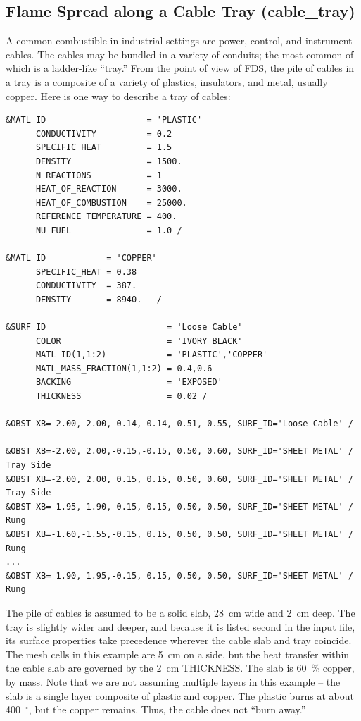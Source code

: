 \documentclass[11pt]{book}
\begin{document}
\clearpage
\subsection{Flame Spread along a Cable Tray ({\bf cable\_tray}) }

A common combustible in industrial settings are power, control, and instrument cables. The cables may be bundled in a variety of conduits; the most
common of which is a ladder-like ``tray.'' From the point of view of FDS, the pile of cables in a tray is a composite of a variety of plastics, insulators,
and metal, usually copper. Here is one way to describe a tray of cables:

\footnotesize
\begin{verbatim}
&MATL ID                    = 'PLASTIC'
      CONDUCTIVITY          = 0.2
      SPECIFIC_HEAT         = 1.5
      DENSITY               = 1500.
      N_REACTIONS           = 1
      HEAT_OF_REACTION      = 3000.
      HEAT_OF_COMBUSTION    = 25000.
      REFERENCE_TEMPERATURE = 400.
      NU_FUEL               = 1.0 /

&MATL ID            = 'COPPER'
      SPECIFIC_HEAT = 0.38
      CONDUCTIVITY  = 387.
      DENSITY       = 8940.   /

&SURF ID                        = 'Loose Cable'
      COLOR                     = 'IVORY BLACK'
      MATL_ID(1,1:2)            = 'PLASTIC','COPPER'
      MATL_MASS_FRACTION(1,1:2) = 0.4,0.6
      BACKING                   = 'EXPOSED'
      THICKNESS                 = 0.02 /

&OBST XB=-2.00, 2.00,-0.14, 0.14, 0.51, 0.55, SURF_ID='Loose Cable' /

&OBST XB=-2.00, 2.00,-0.15,-0.15, 0.50, 0.60, SURF_ID='SHEET METAL' / Tray Side
&OBST XB=-2.00, 2.00, 0.15, 0.15, 0.50, 0.60, SURF_ID='SHEET METAL' / Tray Side
&OBST XB=-1.95,-1.90,-0.15, 0.15, 0.50, 0.50, SURF_ID='SHEET METAL' / Rung
&OBST XB=-1.60,-1.55,-0.15, 0.15, 0.50, 0.50, SURF_ID='SHEET METAL' / Rung
...
&OBST XB= 1.90, 1.95,-0.15, 0.15, 0.50, 0.50, SURF_ID='SHEET METAL' / Rung
\end{verbatim} \normalsize

\noindent
The pile of cables is assumed to be a solid slab, 28~cm wide and 2~cm deep. The tray is slightly wider and deeper, and because it is listed second in
the input file, its surface properties take precedence wherever the cable slab and tray coincide. The mesh cells in this example are 5~cm on a side, but the
heat transfer within the cable slab are governed by the 2~cm {\ct THICKNESS}. The slab is 60~\% copper, by mass. Note that we are not assuming multiple
layers in this example -- the slab is a single layer composite of plastic and copper. The plastic burns at about 400~$^\circ$, but the copper remains. Thus,
the cable does not ``burn away.''
\end{document}
